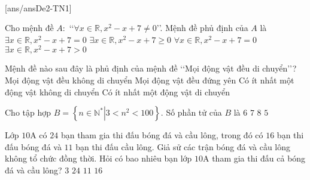 ﻿﻿\begin{name}
	{\tenchude}
	{\tendethi}
	{\tentruong}
	{\thoigian}
\end{name}
\setcounter{ex}{0}\setcounter{bt}{0}
\TN
{}[ans/ansDe2-TN1]
\begin{ex}%
	Cho mệnh đề $A:$ \lq\lq $\forall x\in \mathbb{R}, x^2-x+7\ne 0$\rq\rq. Mệnh đề phủ định của $A$ là
	\choice
	{\True $\exists x \in \mathbb{R},x^2-x+7=0$}
	{$\exists x \in \mathbb{R},x^2-x+7\ge0$}
	{$\forall x \in \mathbb{R},x^2-x+7=0$}
	{$\exists  x \in \mathbb{R},x^2-x+7>0$}
\end{ex}

\begin{ex}%
	Mệnh đề nào sau đây là phủ định của mệnh đề \lq\lq Mọi động vật đều di chuyển\rq\rq?
	\choice
	{Mọi động vật đều không di chuyển}
	{Mọi động vật đều đứng yên}
	{\True Có ít nhất một động vật không di chuyển}
	{Có ít nhất một động vật di chuyển}
\end{ex}

\begin{ex}%
	Cho tập hợp $B=\left\{\left. n\in{\mathbb{N}^*}\right|3<n^2<100\right\}$. Số phần tử của $B$ là
	\choice
	{$6$}
	{$7$}
	{\True $8$}
	{$5$}
\end{ex}

\begin{ex}%
	Lớp $10$A có $24$ bạn tham gia thi đấu bóng đá và cầu lông, trong đó có $16$ bạn thi đấu bóng đá và $11$ bạn thi đấu cầu lông. Giả sử các trận bóng đá và cầu lông không tổ chức đồng thời. Hỏi có bao nhiêu bạn lớp $10$A tham gia thi đấu cả bóng đá và cầu lông?
	\choice
	{\True $3$}
	{$24$}
	{$11$}
	{$16$}
\end{ex}

